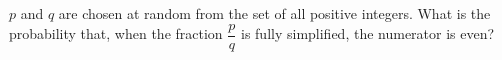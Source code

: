 $p$ and $q$ are chosen at random from the set of all positive integers. What is the probability that, when the fraction $\dfrac{p}{q}$ is fully simplified, the numerator is even?
